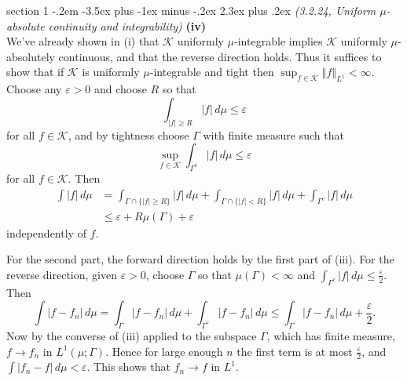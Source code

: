 \documentclass[12pt]{article}
\makeatletter
\theoremstyle{norm}
\providecommand{\cal}[1]{\mathcal{#1}}
\renewcommand{\cal}[1]{\mathcal{#1}}
\newcommand{\Ga}[0]{\Gamma}
\newcommand{\ep}[0]{\varepsilon}
\newcommand{\eph}[0]{\frac{\varepsilon}{2}}
\newcommand{\subprob}[1]{\noindent\textbf{#1}\\}
\newcommand{\iy}[0]{\infty}
\newcommand{\nl}[1]{\left \Vert #1\right \Vert_{L^1}}
\newenvironment{problem}{\@startsection
       {section}
       {1}
       {-.2em}
       {-3.5ex plus -1ex minus -.2ex}
       {2.3ex plus .2ex}
       {\pagebreak[3]%
       \large\bf\noindent{Problem }
       }
       }
       {%
       }
\makeatother
\begin{document}
\begin{problem}{\it(3.2.24, Uniform $\mu$-absolute continuity and integrability)}
\subprob{(iv)}
We've already shown in (i) that $\cal K$ uniformly $\mu$-integrable implies $\cal K$ uniformly $\mu$-absolutely continuous, and that the reverse direction holds. Thus it suffices to show that if $\cal K$ is uniformly $\mu$-integrable and tight then $\sup_{f\in \cal K}\nl{f}<\iy$. Choose any $\ep>0$ and choose $R$ so that
\[
\int_{|f|\ge R}|f|\,d\mu \le \ep
\]
for all $f\in \cal K$, 
and by tightness choose $\Ga$ with finite measure such that 
\[
\sup_{f\in \cal K}\int_{\Ga^c} |f|\,d\mu\le \ep
\]
for all $f\in \cal K$.
Then
\begin{align*}
\int |f|\,d\mu&=\int_{\Ga\cap \{|f|\ge R\}} |f|\,d\mu
+\int_{\Ga\cap \{|f|<R\}} |f|\,d\mu
+\int_{\Ga^c}|f|\,d\mu\\
&\le \ep +R\mu(\Ga)+\ep
\end{align*}
independently of $f$.

For the second part, the forward direction holds by the first part of (iii). For the reverse direction, given $\ep>0$, choose $\Ga$ so that $\mu(\Ga)<\iy$ and $\int_{\Ga^c}|f|\,d\mu\le \eph$. Then
\[
\int|f-f_n|\,d\mu=\int_{\Ga}|f-f_n|\,d\mu+\int_{\Ga^c}|f-f_n|\,d\mu\le 
\int_{\Ga}|f-f_n|\,d\mu+\eph.
\]
Now by the converse of (iii) applied to the subspace $\Ga$, which has finite measure, $f\to f_n$ in $L^1(\mu; \Ga)$. Hence for large enough $n$ the first term is at most $\eph$, and $\int|f_n-f|\,d\mu<\ep$. This shows that $f_n\to f$ in $L^1$.
\end{problem}
\end{document}
